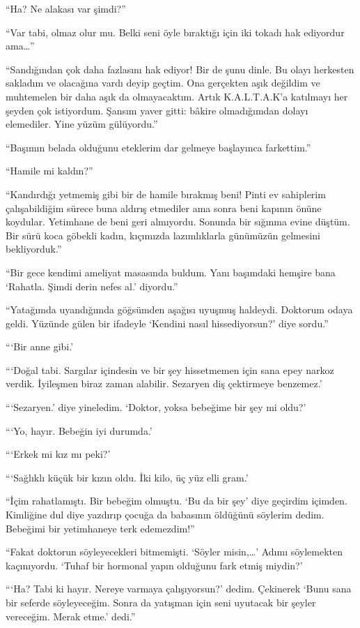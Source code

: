 ``Ha? Ne alakası var şimdi?''

``Var tabi, olmaz olur mu. Belki seni öyle bıraktığı için iki tokadı
hak ediyordur ama\dots''

``Sandığından çok daha fazlasını hak ediyor! Bir de şunu dinle. Bu olayı
herkesten sakladım ve olacağına vardı deyip geçtim. Ona gerçekten aşık değildim
ve muhtemelen bir daha aşık da olmayacaktım. Artık K.A.L.T.A.K'a katılmayı her
şeyden çok istiyordum. Şansım yaver gitti: bâkire olmadığımdan dolayı
elemediler. Yine yüzüm gülüyordu.''

``Başımın belada olduğunu eteklerim dar gelmeye başlayınca farkettim.''

``Hamile mi kaldın?''

``Kandırdığı yetmemiş gibi bir de hamile bırakmış beni! Pinti ev sahiplerim
çalışabildiğim sürece buna aldırış etmediler ama sonra beni kapının önüne
koydular.  Yetimhane de beni geri almıyordu. Sonunda bir sığınma evine düştüm.
Bir sürü koca göbekli kadın, kıçımızda lazımlıklarla günümüzün gelmesini
bekliyorduk.''

``Bir gece kendimi ameliyat masasında buldum. Yanı başımdaki hemşire bana
`Rahatla. Şimdi derin nefes al.' diyordu.''

``Yatağımda uyandığımda göğsümden aşağısı uyuşmuş haldeydi. Doktorum odaya
geldi. Yüzünde gülen bir ifadeyle `Kendini nasıl hissediyorsun?' diye sordu.''

```Bir anne gibi.'

```Doğal tabi. Sargılar içindesin ve bir şey hissetmemen için sana epey narkoz
verdik. İyileşmen biraz zaman alabilir. Sezaryen diş çektirmeye benzemez.'

```Sezaryen.' diye yineledim. `Doktor, yoksa bebeğime bir şey mi oldu?'

```Yo, hayır. Bebeğin iyi durumda.'

```Erkek mi kız mı peki?'

```Sağlıklı küçük bir kızın oldu. İki kilo, üç yüz elli gram.'

``İçim rahatlamıştı. Bir bebeğim olmuştu. `Bu da bir şey' diye geçirdim içimden.
Kimliğine dul diye yazdırıp çocuğa da babasının öldüğünü söylerim dedim.
Bebeğimi bir yetimhaneye terk edemezdim!''

``Fakat doktorun söyleyecekleri bitmemişti. `Söyler misin,\dots' Adımı
söylemekten kaçınıyordu. `Tuhaf bir hormonal yapın olduğunu fark etmiş miydin?'

```Ha? Tabi ki hayır. Nereye varmaya çalışıyorsun?' dedim. Çekinerek `Bunu sana bir
seferde söyleyeceğim. Sonra da yatışman için seni uyutacak bir şeyler vereceğim.
Merak etme.' dedi.''

